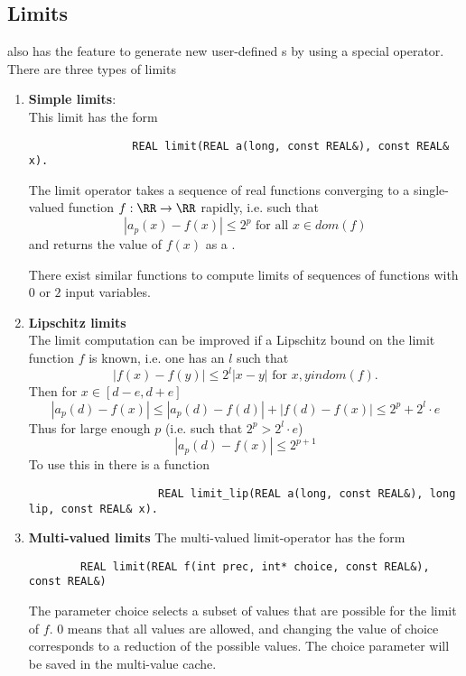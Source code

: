 	\subsection{Limits}
		\irram also has the feature to generate new user-defined {\real}s by using a special  operator.
		There are three types of limits
		\begin{enumerate}
			\item \textbf{Simple limits}: \\
			This limit has the form
			\begin{verbatim}
				REAL limit(REAL a(long, const REAL&), const REAL& x).
			\end{verbatim}

			The limit operator takes a sequence of real functions converging to a single-valued function $f: \RR \to \RR$
			rapidly, i.e. such that 
			$$|a_p(x) - f(x)| \leq 2^p \text{ for all } x \in dom(f)$$
			and returns the value of $f(x)$ as a \real.

			There exist similar functions to compute limits of sequences of functions with $0$ or $2$ input variables.
			\item \textbf{Lipschitz limits} \\
				The limit computation can be improved if a Lipschitz bound on the limit function $f$ is known, i.e. one has an $l$
				such that
				\begin{equation*}
					| f(x) - f(y) | \leq 2^l | x - y | \text{ for } x,y in dom(f).
				\end{equation*}
				Then for $x \in [d-e, d+e]$  
				$$ | a_p(d) - f(x) | \leq | a_p(d) - f(d) | + | f(d) - f(x) |  \leq 2^p + 2^l \cdot e $$
				Thus for large enough $p$ (i.e. such that $2^p > 2^l \cdot e$)
				$$ | a_p(d) - f(x) | \leq  2^{p+1} $$
				To use this in \irram there is a function
				\begin{verbatim}
					REAL limit_lip(REAL a(long, const REAL&), long lip, const REAL& x).
				\end{verbatim}
			\item \textbf{Multi-valued limits}
      The multi-valued limit-operator has the form 
      \begin{verbatim}
        REAL limit(REAL f(int prec, int* choice, const REAL&), const REAL&)
      \end{verbatim}
      The parameter choice selects a subset of values that are possible for the
      limit of $f$. $0$ means that all values are allowed, and changing the
      value of choice corresponds to a reduction of the possible values.
      The choice parameter will be saved in the multi-value cache.
		\end{enumerate}

